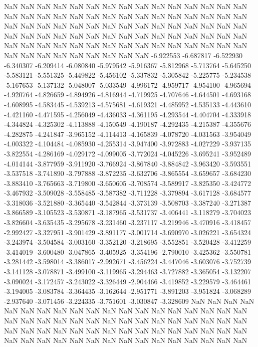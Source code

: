 NaN
NaN
NaN
NaN
NaN
NaN
NaN
NaN
NaN
NaN
NaN
NaN
NaN
NaN
NaN
NaN
NaN
NaN
NaN
NaN
NaN
NaN
NaN
NaN
NaN
NaN
NaN
NaN
NaN
NaN
NaN
NaN
NaN
NaN
NaN
NaN
NaN
NaN
NaN
NaN
NaN
NaN
NaN
NaN
NaN
NaN
NaN
NaN
NaN
NaN
NaN
NaN
NaN
NaN
NaN
NaN
NaN
NaN
NaN
NaN
NaN
NaN
NaN
NaN
NaN
NaN
NaN
NaN
NaN
NaN
NaN
NaN
NaN
NaN
NaN
NaN
NaN
NaN
NaN
NaN
NaN
NaN
NaN
NaN
-6.922553
-6.687817
-6.522930
-6.340307
-6.209414
-6.080840
-5.979542
-5.916367
-5.812968
-5.713764
-5.645250
-5.583121
-5.551325
-5.449822
-5.456102
-5.337832
-5.305842
-5.225775
-5.234538
-5.167653
-5.137132
-5.048007
-5.033549
-4.996172
-4.959717
-4.954100
-4.965694
-4.920764
-4.826659
-4.894926
-4.816944
-4.719925
-4.707646
-4.644501
-4.693168
-4.608995
-4.583445
-4.539213
-4.575681
-4.619321
-4.485952
-4.535133
-4.443610
-4.421160
-4.471595
-4.256049
-4.436033
-4.361195
-4.293544
-4.404704
-4.333918
-4.344824
-4.325302
-4.113888
-4.150549
-4.190187
-4.292435
-4.215387
-4.355676
-4.282875
-4.241847
-3.965152
-4.114413
-4.165839
-4.078720
-4.031563
-3.954049
-4.003322
-4.104484
-4.085930
-4.255314
-3.947400
-3.972883
-4.027229
-3.937135
-3.822554
-4.286169
-4.029172
-4.099005
-3.772024
-4.045226
-3.695241
-3.952489
-4.014144
-3.877959
-3.911920
-3.766924
-3.867840
-3.884842
-3.963420
-3.593551
-3.537518
-3.741890
-3.797888
-3.872235
-3.632706
-3.865554
-3.659657
-3.684230
-3.883410
-3.765663
-3.719800
-3.650605
-3.708574
-3.589917
-3.825350
-3.424772
-3.467932
-3.509028
-3.558485
-3.587382
-3.711228
-3.379894
-3.617128
-3.684577
-3.318036
-3.521880
-3.365440
-3.542844
-3.373139
-3.508703
-3.387240
-3.271387
-3.866589
-3.105523
-3.530871
-3.187965
-3.531737
-3.406441
-3.118279
-3.704023
-3.826604
-3.635435
-3.295678
-3.231460
-3.237117
-3.219946
-3.470916
-3.418457
-2.992427
-3.327951
-3.901429
-3.891177
-3.001714
-3.690970
-3.026221
-3.654324
-3.243974
-3.504584
-3.003160
-3.352120
-3.218695
-3.552851
-3.520428
-3.412259
-3.414019
-3.600480
-3.047865
-3.405925
-3.354196
-2.790010
-3.425362
-3.550781
-3.281442
-3.598014
-3.386017
-2.992671
-3.456224
-3.447046
-3.603076
-3.752739
-3.141128
-3.078871
-3.499100
-3.119965
-3.294463
-3.727882
-3.365054
-3.132207
-3.090024
-3.172457
-3.243022
-3.326449
-2.904466
-3.419852
-3.229579
-3.464461
-3.194005
-3.083784
-3.364435
-3.162644
-2.951771
-3.891203
-3.951824
-3.068289
-2.937640
-3.071456
-3.224335
-3.751601
-3.030847
-3.328609
NaN
NaN
NaN
NaN
NaN
NaN
NaN
NaN
NaN
NaN
NaN
NaN
NaN
NaN
NaN
NaN
NaN
NaN
NaN
NaN
NaN
NaN
NaN
NaN
NaN
NaN
NaN
NaN
NaN
NaN
NaN
NaN
NaN
NaN
NaN
NaN
NaN
NaN
NaN
NaN
NaN
NaN
NaN
NaN
NaN
NaN
NaN
NaN
NaN
NaN
NaN
NaN
NaN
NaN
NaN
NaN
NaN
NaN
NaN
NaN
NaN
NaN
NaN
NaN
